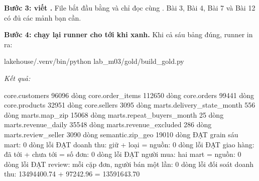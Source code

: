 \textbf{Bước 3: viết .} File bắt đầu bằng  và chỉ đọc  cùng . Bài 3, Bài 4, Bài 7 và Bài 12 có đủ các mảnh bạn cần.

\textbf{Bước 4: chạy lại runner cho tới khi xanh.} Khi cả sáu bảng đúng, runner in ra:

\begin{codeblock}
lakehouse/.venv/bin/python lab_m03/gold/build_gold.py
\end{codeblock}
\textit{Kết quả:}
\begin{codeblock}
core.customers                 96096 dòng
core.order_items              112650 dòng
core.orders                    99441 dòng
core.products                  32951 dòng
core.sellers                    3095 dòng
marts.delivery_state_month       556 dòng
marts.map_zip                  15068 dòng
marts.repeat_buyers_month         25 dòng
marts.revenue_daily            35548 dòng
marts.revenue_excluded           286 dòng
marts.review_seller             3090 dòng
semantic.zip_geo               19010 dòng
ĐẠT  grain sáu mart: 0 dòng lỗi
ĐẠT  doanh thu: giữ + loại = nguồn: 0 dòng lỗi
ĐẠT  giao hàng: đã tới + chưa tới = số đơn: 0 dòng lỗi
ĐẠT  người mua: hai mart = nguồn: 0 dòng lỗi
ĐẠT  review: mỗi cặp đơn, người bán một lần: 0 dòng lỗi
đối soát doanh thu: 13494400.74 + 97242.96 = 13591643.70
\end{codeblock}

